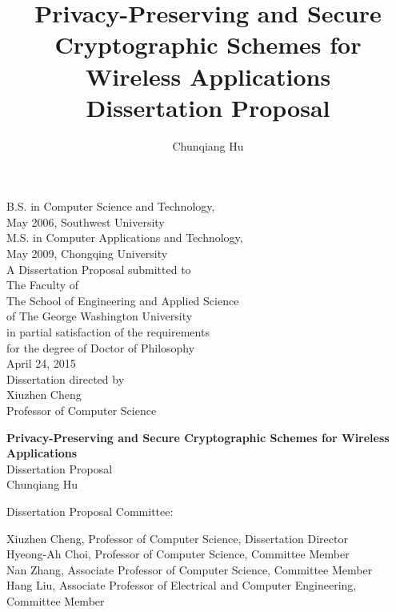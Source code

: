 \documentclass[letterpaper,12pt]{article}
\begin{document}
   \author{{\normalsize Chunqiang Hu}}
   \title{\Large{\bf Privacy-Preserving and Secure Cryptographic Schemes for Wireless Applications} \\ \large Dissertation Proposal}
   \date{}
   \maketitle
   \thispagestyle{empty}
   \begin{center}
       B.S. in Computer Science and Technology,\\ May 2006, Southwest University \\
       M.S. in Computer Applications and Technology,\\ May 2009, Chongqing University \\
       A Dissertation Proposal submitted to\\[\baselineskip]
       The Faculty of\\The School of Engineering and Applied Science\\ of The George
       Washington University\\ in partial satisfaction of the requirements\\ for the degree
       of Doctor of Philosophy\\[\baselineskip]
       April 24, 2015\\[\baselineskip]
       Dissertation directed by\\[\baselineskip]
       Xiuzhen Cheng\\Professor of Computer Science
   \end{center}
   \pagestyle{plain}
   \setcounter{page}{1}



   \newpage
   \doublespacing
   \begin{center}
   {\Large{\bf Privacy-Preserving and Secure Cryptographic Schemes for Wireless Applications }\\ \large Dissertation Proposal}\\[\baselineskip]
   {\normalsize Chunqiang Hu}
   \end{center}
   \noindent Dissertation Proposal Committee:\\

   \hfill\begin{minipage}{5in}
   {Xiuzhen Cheng, Professor of Computer Science, Dissertation
       Director}\\[\baselineskip]
   {Hyeong-Ah Choi, Professor of Computer Science, Committee Member}\\[\baselineskip]
   {Nan Zhang, Associate Professor of Computer Science, Committee Member}\\[\baselineskip]
   {Hang Liu, Associate Professor of Electrical and Computer Engineering, Committee Member}\\[\baselineskip]
   \end{minipage}
\end{document}
